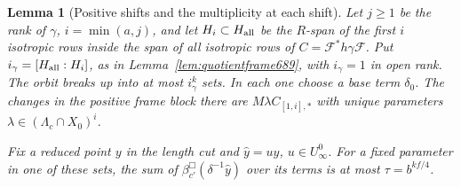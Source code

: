 \documentclass[a4paper,11pt]{article}
\newtheorem{lemma}[proposition]{Lemma}
\theoremstyle{definition}
\theoremstyle{remark}
\numberwithin{equation}{section}
\begin{document}
\begin{lemma}[Positive shifts and the multiplicity at each shift]
\leavevmode\label{lem:orbitfib693}
Let \(j\ge1\) be the rank of \(\gamma\), \(i=\min(a,j)\),
and let \(H_i\subset H_{\rm all}\) be the \(R\)-span of the
first \(i\) isotropic rows inside the span of all isotropic rows
of \(C=\mathcal F^*h\gamma\mathcal F\). Put
\(i_\gamma=[H_{\rm all}:H_i]\), as in
Lemma~\ref{lem:quotientframe689}, with \(i_\gamma=1\) in open
rank. The orbit breaks up into at most \(i_\gamma^k\) sets.
In each one choose a base term \(\delta_0\). The changes in
the positive frame block there are \(M\lambda C_{[1,i],*}\)
with unique parameters \(\lambda\in(\Lambda_c\cap X_0)^i\).

Fix a reduced point \(y\) in the length cut and
\(\widehat y=u y\), \(u\in U_\infty^0\). For a fixed parameter
in one of these sets, the sum of
\(\beta_{c'}^\Box(\delta^{-1}\widehat y)\) over its terms is at
most \(\tau=b^{kf/4}\).
\end{lemma}
\end{document}
